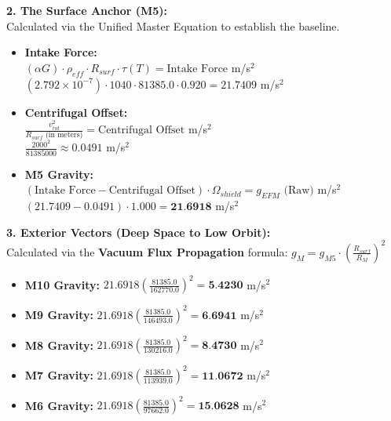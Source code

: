 \documentclass[11pt, a4paper]{article}
\begin{document}
  \vspace{1.0em}
  \noindent \textbf{2. The Surface Anchor (M5):} \\
  \hspace*{1em} Calculated via the Unified Master Equation to establish the baseline.
  \begin{itemize}
    \item \textbf{Intake Force:} \\[0.5em]
    \hspace*{2em} $(\alpha G) \cdot \rho_{eff} \cdot R_{surf} \cdot \tau(T) = \text{Intake Force}$ m/s$^2$ \\[1em]
    \hspace*{2em} $(2.792 \times 10^{-7}) \cdot 1040 \cdot 81385.0 \cdot 0.920 = 21.7409$ m/s$^2$
    
    \item \textbf{Centrifugal Offset:} \\[0.5em]
    \hspace*{2em} $\frac{v_{rot}^2}{R_{surf} \text{ (in meters)}} = \text{Centrifugal Offset}$ m/s$^2$ \\[1em]
    \hspace*{2em} $\frac{2000^2}{81385000} \approx 0.0491$ m/s$^2$
    
    \item \textbf{M5 Gravity:} \\[0.5em]
    \hspace*{2em} $(\text{Intake Force} - \text{Centrifugal Offset}) \cdot \Omega_{shield} = g_{EFM} \text{ (Raw)}$ m/s$^2$ \\[1em]
    \hspace*{2em} $(21.7409 - 0.0491) \cdot 1.000 = \textbf{21.6918}$ m/s$^2$
  \end{itemize}

  \clearpage
  \noindent \textbf{3. Exterior Vectors (Deep Space to Low Orbit):} \\
  \hspace*{1em} Calculated via the \textbf{Vacuum Flux Propagation} formula: $g_M = g_{M5} \cdot \left( \frac{R_{surf}}{R_M} \right)^2$
  \begin{itemize}
    \item \textbf{M10 Gravity:} $21.6918 \left( \frac{81385.0}{162770.0} \right)^2 = \textbf{5.4230}$ m/s$^2$
    \item \textbf{M9 Gravity:} $21.6918 \left( \frac{81385.0}{146493.0} \right)^2 = \textbf{6.6941}$ m/s$^2$
    \item \textbf{M8 Gravity:} $21.6918 \left( \frac{81385.0}{130216.0} \right)^2 = \textbf{8.4730}$ m/s$^2$
    \item \textbf{M7 Gravity:} $21.6918 \left( \frac{81385.0}{113939.0} \right)^2 = \textbf{11.0672}$ m/s$^2$
    \item \textbf{M6 Gravity:} $21.6918 \left( \frac{81385.0}{97662.0} \right)^2 = \textbf{15.0628}$ m/s$^2$
  \end{itemize}
\end{document}
